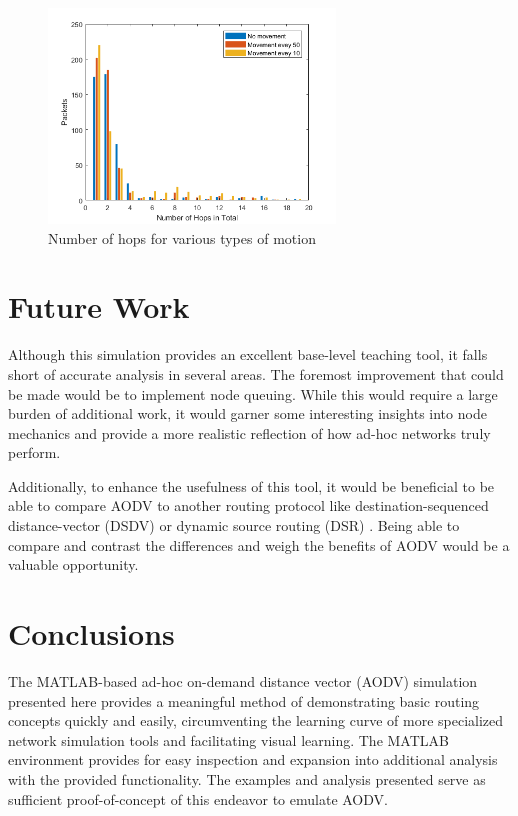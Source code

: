 \documentclass[conference]{IEEEtran}
\begin{document}
\begin{figure}[h]
	\centering
	\includegraphics[width=3in]{hops_overall.png}
	\caption{Number of hops for various types of motion}
	\label{fig:hops}
\end{figure}

\section{Future Work}

Although this simulation provides an excellent base-level teaching tool, it falls short of accurate analysis in several areas. The foremost improvement that could be made would be to implement node queuing. While this would require a large burden of additional work, it would garner some interesting insights into node mechanics and provide a more realistic reflection of how ad-hoc networks truly perform. 

Additionally, to enhance the usefulness of this tool, it would be beneficial to be able to compare AODV to another routing protocol like destination-sequenced distance-vector (DSDV)  \cite{perkins1994highly} or dynamic source routing (DSR) \cite{rfc4728}. Being able to compare and contrast the differences and weigh the benefits of AODV would be a valuable opportunity.

\section{Conclusions}

The MATLAB-based ad-hoc on-demand distance vector (AODV) simulation presented here provides a meaningful method of demonstrating basic routing concepts quickly and easily, circumventing the learning curve of more specialized network simulation tools and facilitating visual learning. The MATLAB environment provides for easy inspection and expansion into additional analysis with the provided functionality. The examples and analysis presented serve as sufficient proof-of-concept of this endeavor to emulate AODV.
\end{document}
